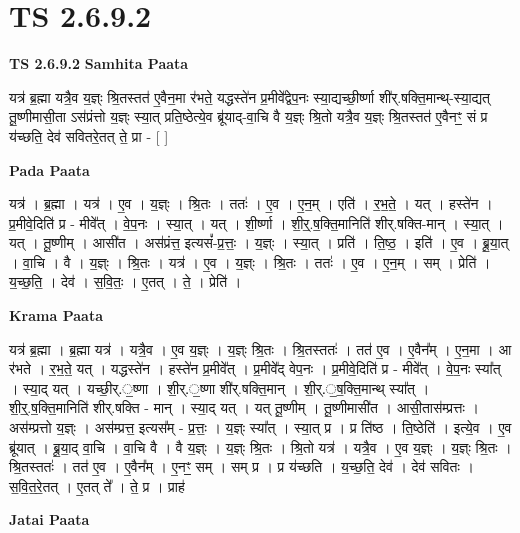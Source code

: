 \documentclass[17pt]{extarticle}
\begin{document}
\section{ TS 2.6.9.2 }

\textbf{TS 2.6.9.2 } \newline
\textbf{Samhita Paata} \newline

यत्र॑ ब्र॒ह्मा यत्रै॒व य॒ज्ञ्ः श्रि॒तस्तत॑ ए॒वैन॒मा र॑भते॒ यद्धस्ते॑न प्र॒मीवे᳚द्वेप॒नः स्या॒द्यच्छी॒र्ष्णा शी॑र्.षक्ति॒मान्थ्-स्या॒द्यत् तू॒ष्णीमासी॒ता ऽस॑प्रंत्तो य॒ज्ञ्ः स्या॒त् प्रति॒ष्ठेत्ये॒व ब्रू॑याद्-वा॒चि वै य॒ज्ञ्ः श्रि॒तो यत्रै॒व य॒ज्ञ्ः श्रि॒तस्तत॑ ए॒वैनꣳ॒॒ सं प्र य॑च्छति॒ देव॑ सवितरे॒तत् ते॒ प्रा - [  ] \newline

\textbf{Pada Paata} \newline

यत्र॑ । ब्र॒ह्मा । यत्र॑ । ए॒व । य॒ज्ञ्ः । श्रि॒तः । ततः॑ । ए॒व । ए॒न॒म् । एति॑ । र॒भ॒ते॒ । यत् । हस्ते॑न । प्र॒मीवे॒दिति॑ प्र - मीवे᳚त् । वे॒प॒नः । स्या॒त् । यत् । शी॒र्ष्णा । शी॒र्॒.ष॒क्ति॒मानिति॑ शीर्.षक्ति-मान् । स्या॒त् । यत् । तू॒ष्णीम् । आसी॑त । अस॑प्रंत्त॒ इत्यसं᳚-प्र॒त्तः॒ । य॒ज्ञ्ः । स्या॒त् । प्रति॑ । ति॒ष्ठ॒ । इति॑ । ए॒व । ब्रू॒या॒त् । वा॒चि । वै । य॒ज्ञ्ः । श्रि॒तः । यत्र॑ । ए॒व । य॒ज्ञ्ः । श्रि॒तः । ततः॑ । ए॒व । ए॒न॒म् । सम् । प्रेति॑ । य॒च्छ॒ति॒ । देव॑ । स॒वि॒तः॒ । ए॒तत् । ते॒ । प्रेति॑ ।  \newline


\textbf{Krama Paata} \newline

यत्र॑ ब्र॒ह्मा । ब्र॒ह्मा यत्र॑ । यत्रै॒व । ए॒व य॒ज्ञ्ः । य॒ज्ञ्ः श्रि॒तः । श्रि॒तस्ततः॑ । तत॑ ए॒व । ए॒वैन᳚म् । ए॒न॒मा । आ र॑भते । र॒भ॒ते॒ यत् । यद्धस्ते॑न । हस्ते॑न प्र॒मीवे᳚त् । प्र॒मीवे᳚द् वेप॒नः । प्र॒मीवे॒दिति॑ प्र - मीवे᳚त् । वे॒प॒नः स्या᳚त् । स्या॒द् यत् । यच्छी॒र्.॒ष्णा । शी॒र्.॒ष्णा शी॑र्.षक्ति॒मान् । शी॒र्.॒ष॒क्ति॒मान्थ् स्या᳚त् । शी॒र्॒.ष॒क्ति॒मानिति॑ शीर्.षक्ति - मान् । स्या॒द् यत् । यत् तू॒ष्णीम् । तू॒ष्णीमासी॑त । आसी॒तास॑म्प्रत्तः । अस॑म्प्रत्तो य॒ज्ञ्ः । अस॑म्प्रत्त॒ इत्यस᳚म् - प्र॒त्तः॒ । य॒ज्ञ्ः स्या᳚त् । स्या॒त् प्र । प्र ति॑ष्ठ । ति॒ष्ठेति॑ । इत्ये॒व । ए॒व ब्रू॑यात् । ब्रू॒या॒द् वा॒चि । वा॒चि वै । वै य॒ज्ञ्ः । य॒ज्ञ्ः श्रि॒तः । श्रि॒तो यत्र॑ । यत्रै॒व । ए॒व य॒ज्ञ्ः । य॒ज्ञ्ः श्रि॒तः । श्रि॒तस्ततः॑ । तत॑ ए॒व । ए॒वैन᳚म् । ए॒नꣳ॒॒ सम् । सम् प्र । प्र य॑च्छति । य॒च्छ॒ति॒ देव॑ । देव॑ सवितः । स॒वि॒त॒रे॒तत् । ए॒तत् ते᳚ । ते॒ प्र । प्राह॑ \newline

\textbf{Jatai Paata} \newline
\end{document}
